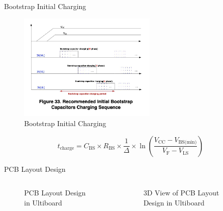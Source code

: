 \begin{frame}{Bootstrap Initial Charging}
	\begin{figure}
		\centering
		\includegraphics[width=2.6in]{sections/ppt/initalChargingGraph.jpg}
		\caption{Bootstrap Initial Charging}
	\end{figure}

	\begin{equation}
		t_\text{charge} = C_\text{BS} \times R_\text{BS} \times \frac{1}{\Delta} \times \ln\left(\frac{V_\text{CC} - V_\text{BS(min)}}{V_\text{F} - V_\text{LS}}\right)
	\end{equation}
\end{frame}

\begin{frame}{PCB Layout Design}
	\begin{columns}
		\begin{figure}
			\centering
			\caption{PCB Layout Design in Ultiboard}
		\end{figure}
		\begin{figure}
			\centering
			\caption{3D View of PCB Layout Design in Ultiboard}
		\end{figure}
	\end{columns}
\end{frame}

